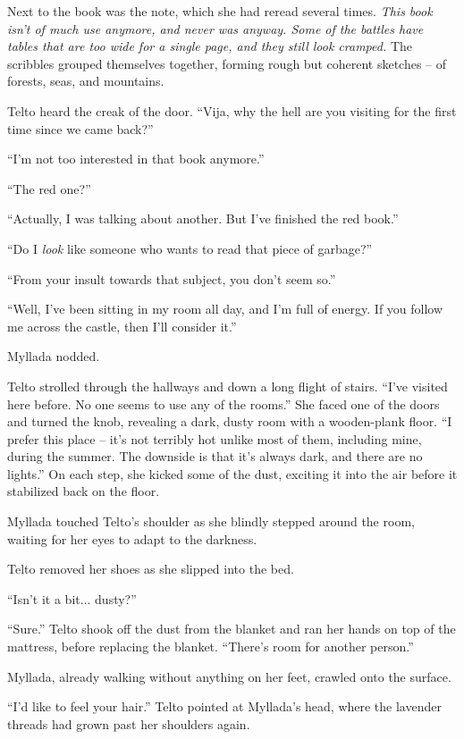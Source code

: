 Next to the book was the note, which she had reread several times. \emph{This book isn't of much use anymore, and never was anyway. Some of the battles have tables that are too wide for a single page, and they still look cramped.} The scribbles grouped themselves together, forming rough but coherent sketches -- of forests, seas, and mountains.

\centeredstars

Telto heard the creak of the door. ``Vija, why the hell are you visiting for the first time since we came back?''

``I'm not too interested in that book anymore.''

``The red one?''

``Actually, I was talking about another. But I've finished the red book.''

``Do I \emph{look} like someone who wants to read that piece of garbage?''

``From your insult towards that subject, you don't seem so.''

``Well, I've been sitting in my room all day, and I'm full of energy. If you follow me across the castle, then I'll consider it.''

Myllada nodded.

\centeredstars

Telto strolled through the hallways and down a long flight of stairs. ``I've visited here before. No one seems to use any of the rooms.'' She faced one of the doors and turned the knob, revealing a dark, dusty room with a wooden-plank floor. ``I prefer this place -- it's not terribly hot unlike most of them, including mine, during the summer. The downside is that it's always dark, and there are no lights.'' On each step, she kicked some of the dust, exciting it into the air before it stabilized back on the floor.

Myllada touched Telto's shoulder as she blindly stepped around the room, waiting for her eyes to adapt to the darkness.

Telto removed her shoes as she slipped into the bed.

``Isn't it a bit... dusty?''

``Sure.'' Telto shook off the dust from the blanket and ran her hands on top of the mattress, before replacing the blanket. ``There's room for another person.''

Myllada, already walking without anything on her feet, crawled onto the surface.

``I'd like to feel your hair.'' Telto pointed at Myllada's head, where the lavender threads had grown past her shoulders again.

